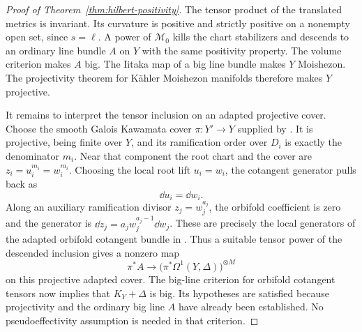 \begin{proof}[Proof of Theorem~\ref{thm:hilbert-positivity}]
The tensor product of the translated metrics is invariant.
Its curvature is positive and strictly positive on a nonempty
open set, since \(s=\ell\). A power of \(\mathcal M_0\) kills
the chart stabilizers and descends to an ordinary line bundle
\(A\) on \(Y\) with the same positivity property. The volume
criterion \cite[author's preprint, Theorem~1.2]{Boucksom2002} makes \(A\) big.
The Iitaka map of a big line bundle makes \(Y\) Moishezon.
The projectivity theorem for K\"ahler Moishezon manifolds
\cite{Moishezon1967} therefore makes \(Y\) projective.

It remains to interpret the tensor inclusion on an adapted
projective cover. Choose the smooth Galois Kawamata cover
\(\pi:Y'\to Y\) supplied by \cite[Lemma~5.2]{CampanaPaun2019}.
It is projective, being finite over \(Y\), and its ramification
order over \(D_i\) is exactly the denominator \(m_i\).
Near that component the root chart and the cover are
\(z_i=u_i^{m_i}=w_i^{m_i}\). Choosing the local root lift
\(u_i=w_i\), the cotangent generator pulls back as
\[
 \dd u_i=\dd w_i.
\]
Along an auxiliary ramification divisor \(z_j=w_j^{a_j}\), the
orbifold coefficient is zero and the generator is
\(\dd z_j=a_jw_j^{a_j-1}\dd w_j\).
These are precisely the local generators of the adapted orbifold
cotangent bundle in \cite[Definition~5.3]{CampanaPaun2019}.
Thus a suitable tensor power of the descended inclusion gives
a nonzero map
\[
 \pi^*A\longrightarrow
 \bigl(\pi^*\Omega^1(Y,\Delta)\bigr)^{\otimes M}
\]
on this projective adapted cover. The big-line criterion for orbifold
cotangent tensors \cite[Theorem~7.11]{CampanaPaun2019} now implies
that \(K_Y+\Delta\) is big. Its hypotheses are satisfied because
projectivity and the ordinary big line \(A\) have already been
established. No pseudoeffectivity assumption is needed in that
criterion.
\end{proof}
